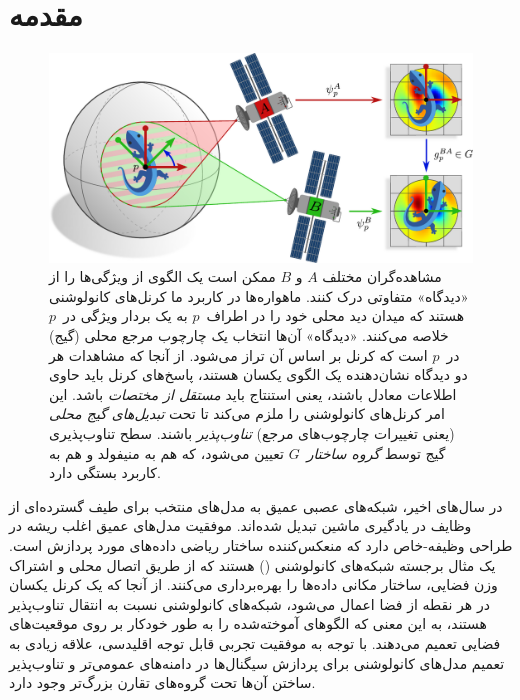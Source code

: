 

\section{مقدمه}


\begin{figure}
	\centering
	\vspace*{-2ex}
	\includegraphics[width=.94\textwidth]{figures/satellite_kernels.pdf}
	\caption{\small
		مشاهده‌گران مختلف $A$ و $B$ ممکن است یک الگوی از ویژگی‌ها را از «دیدگاه» متفاوتی درک کنند.
		ماهواره‌ها در کاربرد ما کرنل‌های کانولوشنی هستند که میدان دید محلی خود را در اطراف~$p$ به یک بردار ویژگی در~$p$ خلاصه می‌کنند.
		«دیدگاه» آن‌ها انتخاب یک چارچوب مرجع محلی (گیج) در~$p$ است که کرنل بر اساس آن تراز می‌شود.
		از آنجا که مشاهدات هر دو دیدگاه نشان‌دهنده یک الگوی یکسان هستند، پاسخ‌های کرنل باید حاوی اطلاعات معادل باشند، یعنی استنتاج باید \emph{مستقل از مختصات} باشد.
		این امر کرنل‌های کانولوشنی را ملزم می‌کند تا تحت \emph{تبدیل‌های گیج محلی} (یعنی تغییرات چارچوب‌های مرجع) \emph{تناوب‌پذیر} باشند.
		سطح تناوب‌پذیری گیج توسط \emph{گروه ساختار}~$G$ تعیین می‌شود، که هم به منیفولد و هم به کاربرد بستگی دارد.
		{\\
			\color{gray}
		}
	}
	\label{fig:satellite}
\end{figure}


در سال‌های اخیر، شبکه‌های عصبی عمیق به مدل‌های منتخب برای طیف گسترده‌ای از وظایف در یادگیری ماشین تبدیل شده‌اند.
موفقیت مدل‌های عمیق اغلب ریشه در طراحی وظیفه-خاص دارد که منعکس‌کننده ساختار ریاضی داده‌های مورد پردازش است.
یک مثال برجسته شبکه‌های کانولوشنی (\CNNs) هستند که از طریق اتصال محلی و اشتراک وزن فضایی، ساختار مکانی داده‌ها را بهره‌برداری می‌کنند.
از آنجا که یک کرنل یکسان در هر نقطه از فضا اعمال می‌شود، شبکه‌های کانولوشنی نسبت به انتقال تناوب‌پذیر هستند، به این معنی که الگوهای آموخته‌شده را به طور خودکار بر روی موقعیت‌های فضایی تعمیم می‌دهند.
با توجه به موفقیت تجربی قابل توجه  اقلیدسی، علاقه زیادی به تعمیم مدل‌های کانولوشنی برای پردازش سیگنال‌ها در دامنه‌های عمومی‌تر و تناوب‌پذیر ساختن آن‌ها تحت گروه‌های تقارن بزرگ‌تر وجود دارد.


